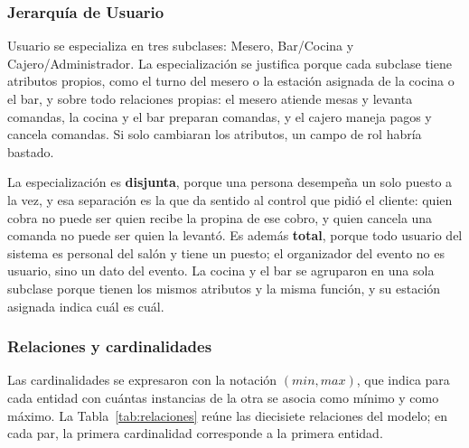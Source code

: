 \subsubsection{Jerarquía de Usuario}

Usuario se especializa en tres subclases: Mesero, Bar/Cocina y Cajero/Administrador. La especialización se justifica porque cada subclase tiene atributos propios, como el turno del mesero o la estación asignada de la cocina o el bar, y sobre todo relaciones propias: el mesero atiende mesas y levanta comandas, la cocina y el bar preparan comandas, y el cajero maneja pagos y cancela comandas. Si solo cambiaran los atributos, un campo de rol habría bastado.

La especialización es \textbf{disjunta}, porque una persona desempeña un solo puesto a la vez, y esa separación es la que da sentido al control que pidió el cliente: quien cobra no puede ser quien recibe la propina de ese cobro, y quien cancela una comanda no puede ser quien la levantó. Es además \textbf{total}, porque todo usuario del sistema es personal del salón y tiene un puesto; el organizador del evento no es usuario, sino un dato del evento. La cocina y el bar se agruparon en una sola subclase porque tienen los mismos atributos y la misma función, y su estación asignada indica cuál es cuál.

\subsubsection{Relaciones y cardinalidades}

Las cardinalidades se expresaron con la notación $(\mathit{min}, \mathit{max})$, que indica para cada entidad con cuántas instancias de la otra se asocia como mínimo y como máximo. La Tabla~\ref{tab:relaciones} reúne las diecisiete relaciones del modelo; en cada par, la primera cardinalidad corresponde a la primera entidad.

